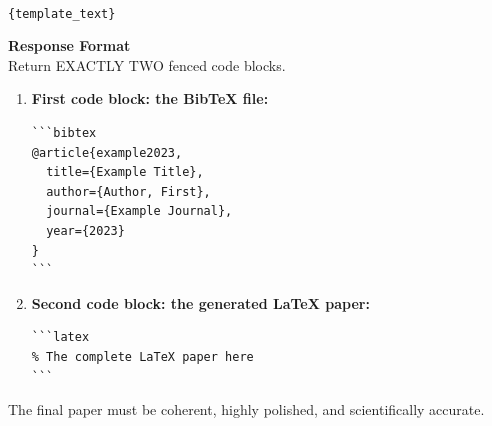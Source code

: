 \vspace{0.5em}
\\
\texttt{\{template\_text\}}

\vspace{1em}
\noindent\textbf{Response Format}\\
\vspace{0.5em}
Return EXACTLY TWO fenced code blocks.

\begin{enumerate}
    \item \textbf{First code block: the BibTeX file:}
\begin{verbatim}
```bibtex
@article{example2023,
  title={Example Title},
  author={Author, First},
  journal={Example Journal},
  year={2023}
}
```
\end{verbatim}

\item \textbf{Second code block: the generated LaTeX paper:}
\begin{verbatim}
```latex
% The complete LaTeX paper here
```
\end{verbatim}
\end{enumerate}

\vspace{1em}
\noindent The final paper must be coherent, highly polished, and scientifically accurate.